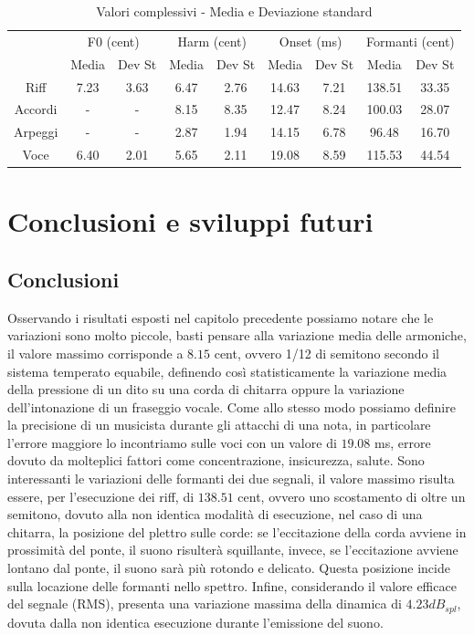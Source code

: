 \documentclass[12pt]{report}
\begin{document}
\begin{table}[htbp]
\begin{center}
\begin{tabular}{|c|c|c|c|c|c|c|c|c|}
\hline
 & \multicolumn{2}{|c|}{F0 (cent)} & \multicolumn{2}{|c|}{Harm (cent)} & \multicolumn{2}{|c|}{Onset (ms)} & \multicolumn{2}{|c|}{Formanti (cent)}\\
 & Media & Dev St & Media & Dev St & Media & Dev St & Media & Dev St\\
\hline
Riff & 7.23 & 3.63 & 6.47 & 2.76 & 14.63 & 7.21 & 138.51 & 33.35\\
\hline
Accordi & - & - & 8.15 & 8.35 & 12.47 & 8.24 & 100.03 & 28.07\\
\hline
Arpeggi & - & - & 2.87 & 1.94 & 14.15 & 6.78 & 96.48 & 16.70\\
\hline
Voce & 6.40 & 2.01 & 5.65 & 2.11 & 19.08 & 8.59 & 115.53 & 44.54\\
\hline
\end{tabular}
\end{center}
\caption{Valori complessivi - Media e Deviazione standard}
\label{tab:due}
\end{table}

\chapter{Conclusioni e sviluppi futuri}
\label{cap5}

	\section{Conclusioni}
	\label{cap5sec1}
	Osservando i risultati esposti nel capitolo precedente possiamo notare che le variazioni sono molto piccole, basti pensare alla variazione media delle armoniche, il valore massimo corrisponde a $8.15$ cent, ovvero 1/12 di semitono secondo il sistema temperato equabile, definendo così statisticamente la variazione media della pressione di un dito su una corda di chitarra oppure la variazione dell'intonazione di un fraseggio vocale. Come allo stesso modo possiamo definire la precisione di un musicista durante gli attacchi di una nota, in particolare l'errore maggiore lo incontriamo sulle voci con un valore di $19.08$ ms, errore dovuto da molteplici fattori come concentrazione, insicurezza, salute. Sono interessanti le variazioni delle formanti dei due segnali, il valore massimo risulta essere, per l'esecuzione dei riff, di $138.51$ cent, ovvero uno scostamento di oltre un semitono, dovuto alla non identica modalità di esecuzione, nel caso di una chitarra, la posizione del plettro sulle corde: se l'eccitazione della corda avviene in prossimità del ponte, il suono risulterà squillante, invece, se l'eccitazione avviene lontano dal ponte, il suono sarà più rotondo e delicato. Questa posizione incide sulla locazione delle formanti nello spettro. Infine, considerando il valore efficace del segnale (RMS), presenta una variazione massima della dinamica di $4.23 dB_{spl}$, dovuta dalla non identica esecuzione durante l'emissione del suono. \\
	
\end{document}
